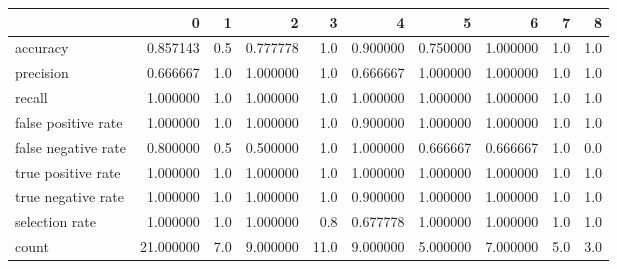 \begin{tabular}{lrrrrrrrrr}
\toprule
{} &          0 &    1 &         2 &     3 &         4 &         5 &         6 &    7 &    8 \\
\midrule
accuracy            &   0.857143 &  0.5 &  0.777778 &   1.0 &  0.900000 &  0.750000 &  1.000000 &  1.0 &  1.0 \\
precision           &   0.666667 &  1.0 &  1.000000 &   1.0 &  0.666667 &  1.000000 &  1.000000 &  1.0 &  1.0 \\
recall              &   1.000000 &  1.0 &  1.000000 &   1.0 &  1.000000 &  1.000000 &  1.000000 &  1.0 &  1.0 \\
false positive rate &   1.000000 &  1.0 &  1.000000 &   1.0 &  0.900000 &  1.000000 &  1.000000 &  1.0 &  1.0 \\
false negative rate &   0.800000 &  0.5 &  0.500000 &   1.0 &  1.000000 &  0.666667 &  0.666667 &  1.0 &  0.0 \\
true positive rate  &   1.000000 &  1.0 &  1.000000 &   1.0 &  1.000000 &  1.000000 &  1.000000 &  1.0 &  1.0 \\
true negative rate  &   1.000000 &  1.0 &  1.000000 &   1.0 &  0.900000 &  1.000000 &  1.000000 &  1.0 &  1.0 \\
selection rate      &   1.000000 &  1.0 &  1.000000 &   0.8 &  0.677778 &  1.000000 &  1.000000 &  1.0 &  1.0 \\
count               &  21.000000 &  7.0 &  9.000000 &  11.0 &  9.000000 &  5.000000 &  7.000000 &  5.0 &  3.0 \\
\bottomrule
\end{tabular}
